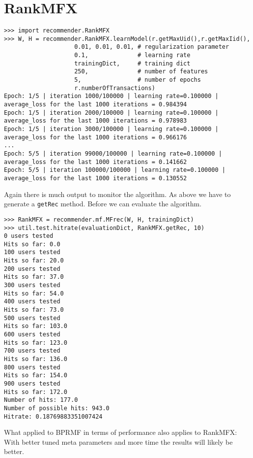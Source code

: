 \section{RankMFX}
\begin{lstlisting}[style=python]
>>> import recommender.RankMFX
>>> W, H = recommender.RankMFX.learnModel(r.getMaxUid(),r.getMaxIid(),
                    0.01, 0.01, 0.01, # regularization parameter
                    0.1,              # learning rate
                    trainingDict,     # training dict
                    250,              # number of features
                    5,                # number of epochs
                    r.numberOfTransactions)
Epoch: 1/5 | iteration 1000/100000 | learning rate=0.100000 | average_loss for the last 1000 iterations = 0.984394
Epoch: 1/5 | iteration 2000/100000 | learning rate=0.100000 | average_loss for the last 1000 iterations = 0.978983
Epoch: 1/5 | iteration 3000/100000 | learning rate=0.100000 | average_loss for the last 1000 iterations = 0.966176
...
Epoch: 5/5 | iteration 99000/100000 | learning rate=0.100000 | average_loss for the last 1000 iterations = 0.141662
Epoch: 5/5 | iteration 100000/100000 | learning rate=0.100000 | average_loss for the last 1000 iterations = 0.130552
\end{lstlisting}
Again there is much output to monitor the algorithm.
As above we have to generate a \lstinline!getRec! method. Before we can evaluate the algorithm.
\begin{lstlisting}[style=python]
>>> RankMFX = recommender.mf.MFrec(W, H, trainingDict)
>>> util.test.hitrate(evaluationDict, RankMFX.getRec, 10)
0 users tested
Hits so far: 0.0
100 users tested
Hits so far: 20.0
200 users tested
Hits so far: 37.0
300 users tested
Hits so far: 54.0
400 users tested
Hits so far: 73.0
500 users tested
Hits so far: 103.0
600 users tested
Hits so far: 123.0
700 users tested
Hits so far: 136.0
800 users tested
Hits so far: 154.0
900 users tested
Hits so far: 172.0
Number of hits: 177.0
Number of possible hits: 943.0
Hitrate: 0.18769883351007424
\end{lstlisting}
What applied to BPRMF in terms of performance also applies to RankMFX:
With better tuned meta parameters and more time the results will likely
be better.


